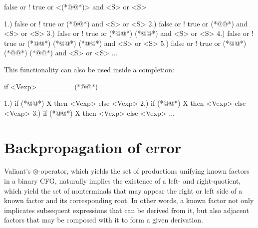 \documentclass[sigplan,review,anonymous,acmsmall]{acmart}\settopmatter{printfolios=false,printccs=false,printacmref=false}
\begin{document}
\begin{tidyinput}
    false or ! true or <(*@@*)> and <S> or <S>
\end{tidyinput}

\begin{tidyoutput}
1.) false or ! true or (*@@*) and <S> or <S>
2.) false or ! true or (*@@*) and <S> or <S>
3.) false or ! true or (*@\hlorange{!}@*) (*@@*) and <S> or <S>
4.) false or ! true or (*@@*) (*@@*) (*@@*) and <S> or <S>
5.) false or ! true or (*@@*) (*@@*) (*@@*) and <S> or <S>
...
\end{tidyoutput}

\noindent This functionality can also be used inside a completion:

\begin{tidyinput}
if <Vexp> _ _ _ _ _(*@\caret{ }@*)
\end{tidyinput}

\begin{tidyoutput}
1.) if (*@@*) X then <Vexp> else <Vexp>
2.) if (*@@*) X then <Vexp> else <Vexp>
3.) if (*@@*) X then <Vexp> else <Vexp>
...
\end{tidyoutput}

\pagebreak\section{Backpropagation of error}


Valiant's $\otimes$-operator, which yields the set of productions unifying known factors in a binary CFG, naturally implies the existence of a left- and right-quotient, which yield the set of nonterminals that may appear the right or left side of a known factor and its corresponding root. In other words, a known factor not only implicates subsequent expressions that can be derived from it, but also adjacent factors that may be composed with it to form a given derivation.
\end{document}
